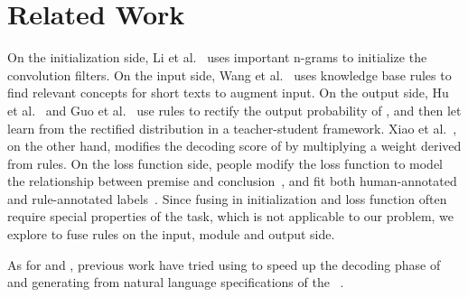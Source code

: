 \section{Related Work}

On the initialization side, Li et al.~ uses important n-grams to initialize the convolution filters. 
On the input side, Wang et al.~ uses knowledge base rules to find relevant concepts for short texts to augment input.
On the output side,
Hu et al.~ and Guo et al.~ use \FOL rules to rectify the output probability of \NN, and then let \NN learn from the rectified distribution in a teacher-student framework.
Xiao et al.~, on the other hand, modifies the decoding score of \NN by multiplying a weight derived from rules.
On the loss function side, people modify the loss function to model the relationship between premise and conclusion~\cite{demeester2016lifted}, and fit both human-annotated and rule-annotated labels~\cite{alashkar2017examples}.
Since fusing in initialization and loss function often require special properties of the task, which is not applicable to our problem, we explore to fuse \RE rules on the input, \NN module and output side.   

As for \NN and \RE, previous work have tried using \RE to speed up the decoding phase of \NN~\cite{strauss2016regular} and
generating \RE from natural language specifications of the \RE~\cite{locascio2016neural}.

